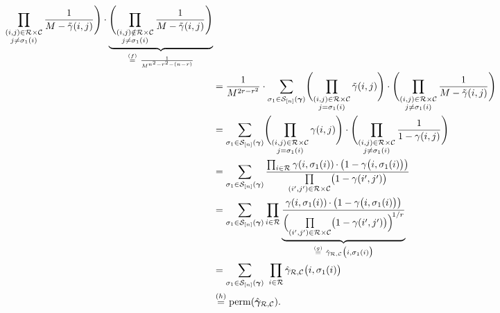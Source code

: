 \documentclass[journal,lettersize,twocolumn]{IEEEtran} %
\newcommand{\vect}[1]{ \bm{#1} }
\newcommand{\set}[1]{\mathcal{#1}}
\newcommand{\vgam}{ \vect{\gamma} }
\newcommand{\perm}{ \mathrm{perm} }
\newcommand{\setC}{\set{C}}
\newcommand{\setR}{\set{R}}
\newcommand{\setS}{\set{S}}
\newcommand{\isigmaoi}{\bigl( i,\sigma_1(i) \bigr)}
\newcommand{\tgam}{\tilde{\gamma}}
\newcommand{\hvgamRCp}{ \hat{\vgam}_{\setR,\setC} }
\newcommand{\hgamRCp}{ \hat{\gamma}_{\setR,\setC} }
\begin{document}
\begin{appendices}
{\begin{align}
         \prod_{\substack{(i,j) \in \setR \times \setC \\ j \neq \sigma_1(i)}}
           \frac{ 1 }
                { M - \tgam(i,j) }
       \Biggr)
       \cdot
       \underbrace{
         \Biggl( 
           \prod_{\substack{(i,j) \notin \setR \times \setC \\ j \neq \sigma_1(i)}}
             \frac{ 1 }
                  { M - \tgam(i,j) }
         \Biggr)
       }_{\overset{(f)}{=} \ \frac{1}{M^{n^2 - r^2 - (n - r)}}} \nonumber \\
    &= \frac{1}{M^{ 2r -  r^2}}
       \cdot
       \sum_{\sigma_1 \in \setS_{[n]}( \vgam )}
       \Biggl( 
         \prod_{\substack{(i,j) \in \setR \times \setC \\ j = \sigma_1(i)}}
           \tgam(i,j)
       \Biggr)
       \cdot
       \Biggl( 
         \prod_{\substack{(i,j) \in \setR \times \setC \\ j \neq \sigma_1(i)}}
           \frac{ 1 }
                { M - \tgam(i,j) }
       \Biggr) \nonumber \\
    &= \sum_{\sigma_1 \in \setS_{[n]}( \vgam )}
       \Biggl( 
         \prod_{\substack{(i,j) \in \setR \times \setC \\ j = \sigma_1(i)}}
           \gamma(i,j)
       \Biggr)
       \cdot
       \Biggl( 
         \prod_{\substack{(i,j) \in \setR \times \setC \\ j \neq \sigma_1(i)}}
           \frac{ 1 }
                { 1 - \gamma(i,j) }
       \Biggr) \nonumber \\
    &= \sum_{\sigma_1 \in \setS_{[n]}( \vgam )} 
         \frac{\prod_{i \in \setR}
                 \gamma(i,\sigma_1(i))
                 \, \cdot \,
                 \bigr( 1 - \gamma\isigmaoi \bigl)
              }
              {\prod\limits_{(i',j') \in \setR \times \setC}
                 \bigr( 1 - \gamma(i',j') \bigl)
              } \nonumber \\
    &= \sum_{\sigma_1 \in \setS_{[n]}( \vgam )} 
         \prod_{i \in \setR}
           \underbrace
           {
             \frac{
                   \gamma(i,\sigma_1(i))
                   \, \cdot \,
                   \bigr( 1 - \gamma\isigmaoi \bigl)
                  }
                  {
                   \Bigl(
                     \prod\limits_{(i',j') \in \setR \times \setC}
                     \bigr( 1 - \gamma(i',j') \bigl)
                   \Bigr)^{\! 1 / r}
                  }
           }_{\overset{(g)}{=} \ \hgamRCp\isigmaoi}
    \nonumber \\
    &= \sum_{\sigma_1 \in \setS_{[n]}( \vgam )} \ 
         \prod_{i \in \setR}
           \hgamRCp\isigmaoi
             \nonumber \\
    &\overset{(h)}{=}
       \perm(\hvgamRCp).
         \label{eqn: derivations of recursion of CBM}
\end{align}
}


\end{appendices}
\end{document}
